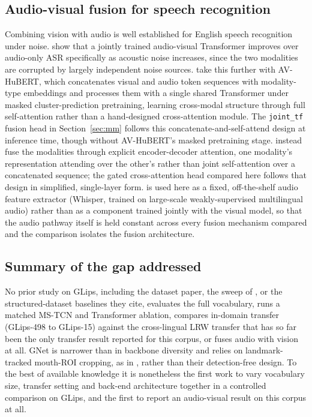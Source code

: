\documentclass[10pt, a4paper]{article}
\begin{document}
\subsection{Audio-visual fusion for speech recognition}
\label{sec:relwork-av}
\noindent Combining vision with audio is well established for English speech recognition under noise. \citet{afouras2018deep} show that a jointly trained audio-visual Transformer improves over audio-only ASR specifically as acoustic noise increases, since the two modalities are corrupted by largely independent noise sources. \citet{shi2022avhubert} take this further with AV-HuBERT, which concatenates visual and audio token sequences with modality-type embeddings and processes them with a single shared Transformer under masked cluster-prediction pretraining, learning cross-modal structure through full self-attention rather than a hand-designed cross-attention module. The \texttt{joint\_tf} fusion head in Section~\ref{sec:mm} follows this concatenate-and-self-attend design at inference time, though without AV-HuBERT's masked pretraining stage. \citet{afouras2018deep} instead fuse the modalities through explicit encoder-decoder attention, one modality's representation attending over the other's rather than joint self-attention over a concatenated sequence; the gated cross-attention head compared here follows that design in simplified, single-layer form. \citet{radford2022whisper} is used here as a fixed, off-the-shelf audio feature extractor (Whisper, trained on large-scale weakly-supervised multilingual audio) rather than as a component trained jointly with the visual model, so that the audio pathway itself is held constant across every fusion mechanism compared and the comparison isolates the fusion architecture.
\subsection{Summary of the gap addressed}
\noindent No prior study on GLips, including the dataset paper, the sweep of \citet{ameer2024}, or the structured-dataset baselines they cite, evaluates the full vocabulary, runs a matched MS-TCN and Transformer ablation, compares in-domain transfer (GLips-498 to GLips-15) against the cross-lingual LRW transfer that has so far been the only transfer result reported for this corpus, or fuses audio with vision at all. GNet is narrower than \citet{ameer2024} in backbone diversity and relies on landmark-tracked mouth-ROI cropping, as in \citet{schwiebert2022glips}, rather than their detection-free design. To the best of available knowledge it is nonetheless the first work to vary vocabulary size, transfer setting and back-end architecture together in a controlled comparison on GLips, and the first to report an audio-visual result on this corpus at all.
\end{document}
